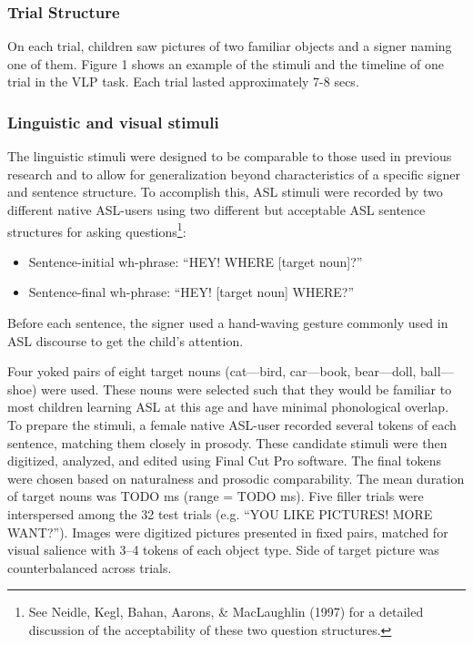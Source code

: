 \documentclass[12pt,]{article}
\let\rmarkdownfootnote\footnote%
\def\footnote{\protect\rmarkdownfootnote}
\begin{document}
\subsubsection{Trial Structure}\label{trial-structure}

On each trial, children saw pictures of two familiar objects and a
signer naming one of them. Figure 1 shows an example of the stimuli and
the timeline of one trial in the VLP task. Each trial lasted
approximately 7-8 secs.

\subsubsection{Linguistic and visual
stimuli}\label{linguistic-and-visual-stimuli}

The linguistic stimuli were designed to be comparable to those used in
previous research and to allow for generalization beyond characteristics
of a specific signer and sentence structure. To accomplish this, ASL
stimuli were recorded by two different native ASL-users using two
different but acceptable ASL sentence structures for asking
questions\footnote{See Neidle, Kegl, Bahan, Aarons, \& MacLaughlin
  (1997) for a detailed discussion of the acceptability of these two
  question structures.}:

\begin{itemize}
\itemsep1pt\parskip0pt
\item
  Sentence-initial wh-phrase: ``HEY! WHERE {[}target noun{]}?''
\item
  Sentence-final wh-phrase: ``HEY! {[}target noun{]} WHERE?''
\end{itemize}

Before each sentence, the signer used a hand-waving gesture commonly
used in ASL discourse to get the child's attention.

Four yoked pairs of eight target nouns (cat---bird, car---book,
bear---doll, ball---shoe) were used. These nouns were selected such that
they would be familiar to most children learning ASL at this age and
have minimal phonological overlap. To prepare the stimuli, a female
native ASL-user recorded several tokens of each sentence, matching them
closely in prosody. These candidate stimuli were then digitized,
analyzed, and edited using Final Cut Pro software. The final tokens were
chosen based on naturalness and prosodic comparability. The mean
duration of target nouns was TODO ms (range = TODO ms). Five filler
trials were interspersed among the 32 test trials (e.g. ``YOU LIKE
PICTURES! MORE WANT?''). Images were digitized pictures presented in
fixed pairs, matched for visual salience with 3--4 tokens of each object
type. Side of target picture was counterbalanced across trials.
\end{document}
